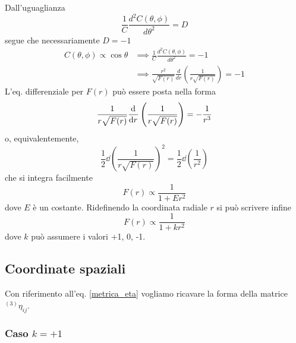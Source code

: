 Dall'uguaglianza
\begin{equation}
  \frac{1}{C} \frac{d^2 C(\theta,\phi)}{d \theta^2} = D
\end{equation}
segue che necessariamente $D=-1$
\begin{equation}
  \begin{split}
    C(\theta,\phi) \propto \cos \theta & \implies
    \frac{1}{C} \frac{d^2 C(\theta,\phi)}{d \theta^2} = -1 \\
    & \implies
    \frac{r^2}{\sqrt{ F(r)}} \frac{d}{dr} \left( \frac{1}{r \sqrt{F(r)}}\right)=
    -1
  \end{split}
\end{equation}
L'eq. differenziale per $F(r)$ può essere posta nella forma
\begin{equation}
  \frac{1}{r\sqrt{F(r)}}\frac{{\mathop{}\!\mathrm{d}^{}}}{\mathop{}\!\mathrm{d} {r}^{}} \left(\frac{1}{r \sqrt{F(r)}}\right)= -
  \frac{1}{r^3}
\end{equation}
o, equivalentemente,
\begin{equation}
  \frac{1}{2} \dd \left( \frac{1}{r \sqrt{F(r)}} \right)^2 =
  \frac{1}{2} \dd \left(\frac{1}{r^2}\right)
\end{equation}
che si integra facilmente
\begin{equation}
  F(r) \propto \frac{1}{1+E r^2}
\end{equation}
dove $E$ è un costante.  Ridefinendo la coordinata radiale $r$ si può scrivere
infine
\begin{equation}
  F(r) \propto \frac{1}{1+k r^2}
\end{equation}
dove $k$ può assumere i valori +1, 0, -1.

\subsection{Coordinate spaziali}

Con riferimento all'eq. \eqref{metrica_eta} vogliamo ricavare la forma della
matrice $^{(3)}\eta_{ij}$.

\subsubsection{Caso $k=+1$}

